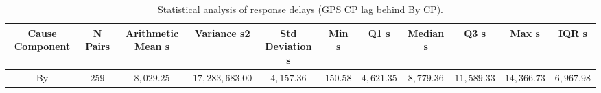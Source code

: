\vspace{-3pt}
\begin{table}[H]
\caption{Statistical analysis of response delays (GPS CP lag behind By CP).\label{tab:Response_Delay_Summary_Statistics_300_By}}
\begin{tabularx}{\textwidth}{CCCCCCCCCCC}
\toprule
\textbf{Cause Component} & \textbf{N Pairs} & \textbf{Arithmetic Mean s} & \textbf{Variance s2} & \textbf{Std Deviation s} & \textbf{Min s} & \textbf{Q1 s} & \textbf{Median s} & \textbf{Q3 s} & \textbf{Max s} & \textbf{IQR s} \\
\midrule
By & $259$ & $8,029.25$ & $17,283,683.00$ & $4,157.36$ & $150.58$ & $4,621.35$ & $8,779.36$ & $11,589.33$ & $14,366.73$ & $6,967.98$ \\
\bottomrule
\end{tabularx}
\end{table}
\vspace{-3pt}
